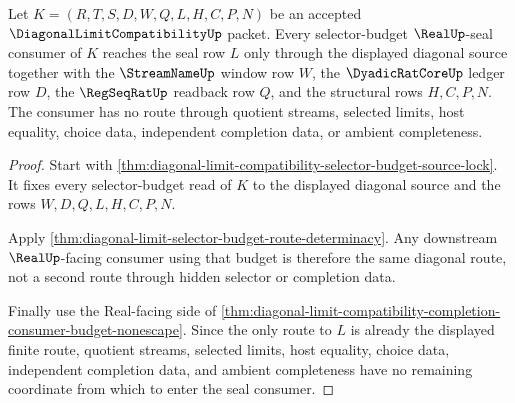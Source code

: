 \begin{theorem}
\label{thm:diagonal-limit-selector-budget-real-seal-nonescape}
Let $K=(R,T,S,D,W,Q,L,H,C,P,N)$ be an accepted $\DiagonalLimitCompatibilityUp$ packet. Every selector-budget $\RealUp$-seal consumer of $K$ reaches the seal row $L$ only through the displayed diagonal source together with the $\StreamNameUp$ window row $W$, the $\DyadicRatCoreUp$ ledger row $D$, the $\RegSeqRatUp$ readback row $Q$, and the structural rows $H,C,P,N$. The consumer has no route through quotient streams, selected limits, host equality, choice data, independent completion data, or ambient completeness.
\end{theorem}
\begin{proof}
Start with \autoref{thm:diagonal-limit-compatibility-selector-budget-source-lock}. It fixes every selector-budget read of $K$ to the displayed diagonal source and the rows $W,D,Q,L,H,C,P,N$.

Apply \autoref{thm:diagonal-limit-selector-budget-route-determinacy}. Any downstream $\RealUp$-facing consumer using that budget is therefore the same diagonal route, not a second route through hidden selector or completion data.

Finally use the Real-facing side of \autoref{thm:diagonal-limit-compatibility-completion-consumer-budget-nonescape}. Since the only route to $L$ is already the displayed finite route, quotient streams, selected limits, host equality, choice data, independent completion data, and ambient completeness have no remaining coordinate from which to enter the seal consumer.
\end{proof}

